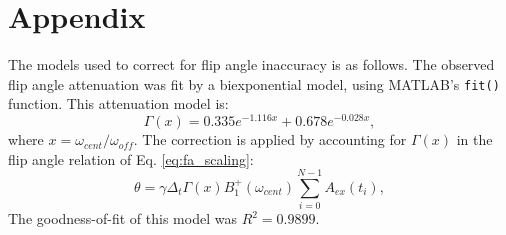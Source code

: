 \documentclass[a4paper,12pt]{article}
\begin{document}
\section*{Appendix}
The models used to correct for flip angle inaccuracy is as follows. The observed flip angle attenuation was fit by a biexponential model, using MATLAB's \texttt{fit()} function. 
This attenuation model is: 
\begin{equation*}
    \Gamma(x) = 0.335e^{-1.116x}+0.678e^{-0.028x},
\end{equation*}
where $x= \omega_{cent}/\omega_{off}$.
The correction is applied by accounting for $\Gamma(x)$ in the flip angle relation of Eq. \ref{eq:fa_scaling}:
\begin{equation*}
    \theta = \gamma \Delta_t \Gamma(x) B_1^+(\omega_{cent})  \sum_{i=0}^{N-1} A_{ex}(t_i),
\end{equation*}
The goodness-of-fit of this model was $R^2=0.9899$.
\end{document}
